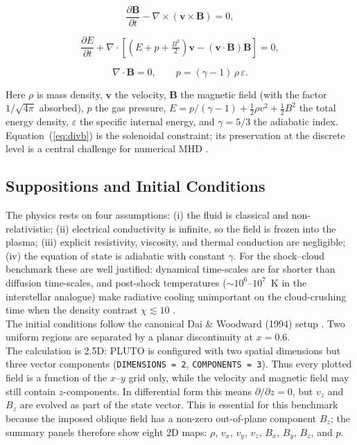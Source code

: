\documentclass[11pt,a4paper]{article}
\begin{document}
\begin{equation}
\frac{\partial \mathbf{B}}{\partial t} - \nabla \times (\mathbf{v} \times \mathbf{B}) = 0,
\label{eq:ind}
\end{equation}

\begin{equation}
\frac{\partial E}{\partial t} + \nabla \cdot \left[ \left(E + p + \tfrac{B^2}{2}\right)\mathbf{v} - (\mathbf{v} \cdot \mathbf{B})\mathbf{B} \right] = 0,
\label{eq:e}
\end{equation}

\begin{equation}
\nabla \cdot \mathbf{B} = 0, \qquad p = (\gamma - 1)\,\rho\,\varepsilon.
\label{eq:divb}
\end{equation}

Here $\rho$ is mass density, $\mathbf{v}$ the velocity, $\mathbf{B}$ the magnetic field (with the factor $1/\sqrt{4\pi}$ absorbed), $p$ the gas pressure, $E = p/(\gamma-1) + \tfrac{1}{2}\rho v^2 + \tfrac{1}{2}B^2$ the total energy density, $\varepsilon$ the specific internal energy, and $\gamma = 5/3$ the adiabatic index. Equation~(\ref{eq:divb}) is the solenoidal constraint; its preservation at the discrete level is a central challenge for numerical MHD \cite{brackbill1980, toth2000}.

\subsection{Suppositions and Initial Conditions}

The physics rests on four assumptions: (i) the fluid is classical and non-relativistic; (ii) electrical conductivity is infinite, so the field is frozen into the plasma; (iii) explicit resistivity, viscosity, and thermal conduction are negligible; (iv) the equation of state is adiabatic with constant $\gamma$. For the shock--cloud benchmark these are well justified: dynamical time-scales are far shorter than diffusion time-scales, and post-shock temperatures ($\sim 10^{6}$--$10^{7}$~K in the interstellar analogue) make radiative cooling unimportant on the cloud-crushing time when the density contrast $\chi \lesssim 10$ \cite{shin2008}.
\\

The initial conditions follow the canonical Dai \& Woodward (1994) setup \cite{dai1994}. Two uniform regions are separated by a planar discontinuity at $x = 0.6$.
\\

The calculation is 2.5D: PLUTO is configured with two spatial dimensions but three vector components (\texttt{DIMENSIONS = 2}, \texttt{COMPONENTS = 3}). Thus every plotted field is a function of the $x$--$y$ grid only, while the velocity and magnetic field may still contain $z$-components. In differential form this means $\partial/\partial z = 0$, but $v_z$ and $B_z$ are evolved as part of the state vector. This is essential for this benchmark because the imposed oblique field has a non-zero out-of-plane component $B_z$; the summary panels therefore show eight 2D maps: $\rho$, $v_x$, $v_y$, $v_z$, $B_x$, $B_y$, $B_z$, and $p$.
\end{document}
